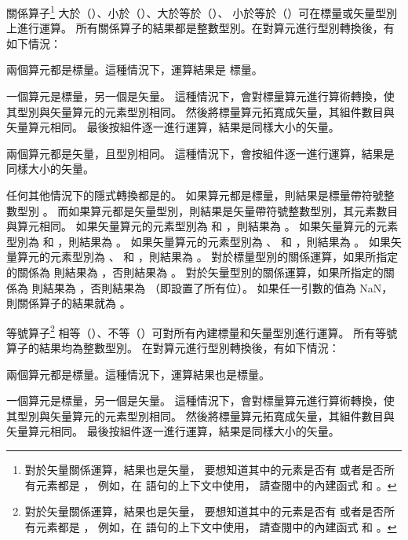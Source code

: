 {%
關係算子\footnote{
對於矢量關係運算，結果也是矢量，
要想知道其中的元素是否有  或者是否所有元素都是 ，
例如，在  語句的上下文中使用，
請查閱中的內建函式  和 。}
大於（\ccmm{>}）、小於（\ccmm{<}）、大於等於（\ccmm{>=}）、
小於等於（\ccmm{<=}）可在標量或矢量型別上進行運算。
所有關係算子的結果都是整數型別。在對算元進行型別轉換後，有如下情況：
\startigBig
\item 兩個算元都是標量。這種情況下，運算結果是  標量。

\item 一個算元是標量，另一個是矢量。
這種情況下，會對標量算元進行算術轉換，使其型別與矢量算元的元素型別相同。
然後將標量算元拓寬成矢量，其組件數目與矢量算元相同。
最後按組件逐一進行運算，結果是同樣大小的矢量。

\item 兩個算元都是矢量，且型別相同。
這種情況下，會按組件逐一進行運算，結果是同樣大小的矢量。
\stopigBig

任何其他情況下的隱式轉換都是的。
如果算元都是標量，則結果是標量帶符號整數型別 。
而如果算元都是矢量型別，則結果是矢量帶符號整數型別，其元素數目與算元相同。
如果矢量算元的元素型別為  和 ，則結果為 。
如果矢量算元的元素型別為  和 ，則結果為 。
如果矢量算元的元素型別為 、  和 ，則結果為 。
如果矢量算元的元素型別為 、  和 ，則結果為 。
對於標量型別的關係運算，如果所指定的關係為  則結果為 ，否則結果為 。
對於矢量型別的關係運算，如果所指定的關係為  則結果為 ，否則結果為  （即設置了所有位）。
如果任一引數的值為 NaN，則關係算子的結果就為 。
\stopitem

\startitem
等號算子\footnote{
對於矢量關係運算，結果也是矢量，
要想知道其中的元素是否有  或者是否所有元素都是 ，
例如，在  語句的上下文中使用，
請查閱中的內建函式  和 。}
相等（\ccmm{==}）、不等（\ccmm{!=}）可對所有內建標量和矢量型別進行運算。
所有等號算子的結果均為整數型別。
在對算元進行型別轉換後，有如下情況：
\startigBig
\item 兩個算元都是標量。這種情況下，運算結果也是標量。

\item 一個算元是標量，另一個是矢量。
這種情況下，會對標量算元進行算術轉換，使其型別與矢量算元的元素型別相同。
然後將標量算元拓寬成矢量，其組件數目與矢量算元相同。
最後按組件逐一進行運算，結果是同樣大小的矢量。

}
